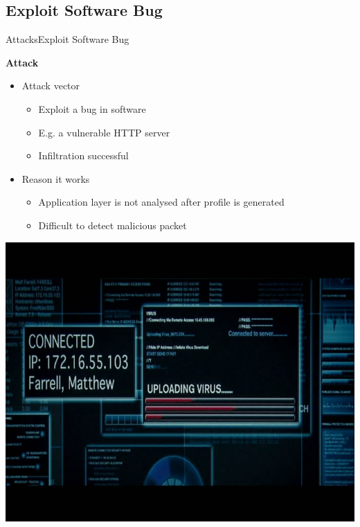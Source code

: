 \subsection{Exploit Software Bug}
\begin{frame}{Attacks}{Exploit Software Bug}


\begin{minipage}{0.48\textwidth}
	
\textbf{Attack}

\begin{itemize}
	\item Attack vector
	\begin{itemize}
		\item Exploit a bug in software
		\item E.g. a vulnerable HTTP server
		\item Infiltration successful
	\end{itemize}

	\item Reason it works
	\begin{itemize}
		\item Application layer is not analysed after profile is generated
		\item Difficult to detect malicious packet
	\end{itemize}
\end{itemize}

\end{minipage}
\hfill
\begin{minipage}{0.50\textwidth}
\includegraphics[width=1\textwidth]{figs/upload_virus}
	
\end{minipage}

\end{frame}

